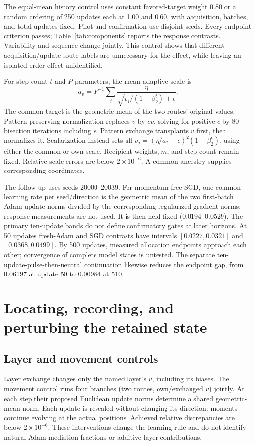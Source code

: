 The equal-mean history control uses constant favored-target weight 0.80 or a random ordering of 250 updates each at 1.00 and 0.60, with acquisition, batches, and total updates fixed. Pilot and confirmation use disjoint seeds. Every endpoint criterion passes; Table~\ref{tab:components} reports the response contrasts. Variability and sequence change jointly. This control shows that different acquisition/update route labels are unnecessary for the effect, while leaving an isolated order effect unidentified.

For step count $t$ and $P$ parameters, the mean adaptive scale is
\begin{equation}\bar a_v=P^{-1}\sum_j\frac{\eta}{\sqrt{v_j/(1-\beta_2^t)}+\epsilon}.\end{equation}
The common target is the geometric mean of the two routes' original values. Pattern-preserving normalization replaces $v$ by $cv$, solving for positive $c$ by 80 bisection iterations including $\epsilon$. Pattern exchange transplants $v$ first, then normalizes it. Scalarization instead sets all $v_j=(\eta/a_\ast-\epsilon)^2(1-\beta_2^t)$, using either the common or own scale. Recipient weights, $m$, and step count remain fixed. Relative scale errors are below $2\times10^{-6}$. A common ancestry supplies corresponding coordinates.

The follow-up uses seeds 20000--20039. For momentum-free SGD, one common learning rate per seed/direction is the geometric mean of the two first-batch Adam-update norms divided by the corresponding regularized-gradient norms; response measurements are not used. It is then held fixed (0.0194--0.0529). The primary ten-update bands do not define confirmatory gates at later horizons. At 50 updates fresh-Adam and SGD contrasts have intervals $[0.0227,0.0321]$ and $[0.0368,0.0499]$. By 500 updates, measured allocation endpoints approach each other; convergence of complete model states is untested. The separate ten-update-pulse-then-neutral continuation likewise reduces the endpoint gap, from 0.06197 at update 50 to 0.00984 at 510.

\section{Locating, recording, and perturbing the retained state}
\label{app:mechanism}
\subsection{Layer and movement controls}
\label{app:layers}
Layer exchange changes only the named layer's $v$, including its biases. The movement control runs four branches (two routes, own/exchanged $v$) jointly. At each step their proposed Euclidean update norms determine a shared geometric-mean norm. Each update is rescaled without changing its direction; moments continue evolving at the actual positions. Achieved relative discrepancies are below $2\times10^{-6}$. These interventions change the learning rule and do not identify natural-Adam mediation fractions or additive layer contributions.

